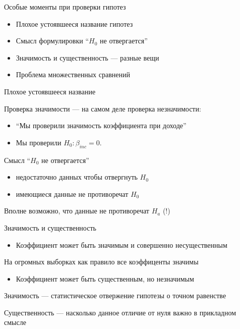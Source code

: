 \documentclass[ignorenonframetext,]{beamer}
\begin{document}
\begin{frame}{Особые моменты при проверки гипотез}

\begin{itemize}
\item
  Плохое устоявшееся название гипотез
\item
  Смысл формулировки ``\(H_0\) не отвергается''
\item
  Значимость и существенность --- разные вещи
\item
  Проблема множественных сравнений
\end{itemize}

\end{frame}

\begin{frame}{Плохое устоявшееся название}

Проверка значимости --- на самом деле проверка незначимости:

\begin{itemize}
\item
  ``Мы проверили значимость коэффициента при доходе''
\item
  Мы проверили \(H_0: \beta_{inc}=0\).
\end{itemize}

\end{frame}

\begin{frame}{Смысл ``\(H_0\) не отвергается''}

\begin{itemize}
\item
  недостаточно данных чтобы отвергнуть \(H_0\)
\item
  имеющиеся данные не противоречат \(H_0\)
\end{itemize}

Вполне возможно, что данные не противоречат \(H_a\) (!)

\end{frame}

\begin{frame}{Значимость и существенность}

\begin{itemize}
\itemsep1pt\parskip0pt
\item
  Коэффициент может быть значимым и совершенно несущественным
\end{itemize}

На огромных выборках как правило все коэффиценты значимы

\begin{itemize}
\itemsep1pt\parskip0pt
\item
  Коэффициент может быть существенным, но незначимым
\end{itemize}

Значимость --- статистическое отвержение гипотезы о точном равенстве

Существенность --- насколько данное отличие от нуля важно в прикладном
смысле

\end{frame}
\end{document}
